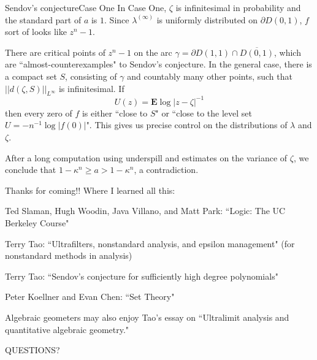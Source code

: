 \documentclass[10pt]{beamer}
\begin{document}
\begin{frame}{Sendov's conjecture}{Case One}
    In Case One, $\zeta$ is infinitesimal in probability and the standard part of $a$ is $1$. \pause
    Since $\lambda^{(\infty)}$ is uniformly distributed on $\partial D(0, 1)$, $f$ sort of looks like $z^n - 1$.

\pause

    There are critical points of $z^n - 1$ on the arc $\gamma = \partial D(1, 1) \cap \overline{D(0, 1)}$, which are ``almost-counterexamples" to Sendov's conjecture. \pause
    In the general case, there is a compact set $S$, consisting of $\gamma$ and countably many other points, such that $||d(\zeta, S)||_{L^\infty}$ is infinitesimal. \pause
    If
    $$U(z) = \mathbf E \log |z - \zeta|^{-1}$$
    then every zero of $f$ is either ``close to $S$" or ``close to the level set $U = -n^{-1}\log |f(0)|$".
    This gives us precise control on the distributions of $\lambda$ and $\zeta$.

\pause

    After a long computation using underspill and estimates on the variance of $\zeta$, we conclude that $1 - \kappa^n \geq a > 1 - \kappa^n$, a contradiction.
\end{frame}

\begin{frame}{Thanks for coming!!}
    Where I learned all this:

    Ted Slaman, Hugh Woodin, Java Villano, and Matt Park: ``Logic: The UC Berkeley Course"

    Terry Tao: ``Ultrafilters, nonstandard analysis, and epsilon management" (for nonstandard methods in analysis)

    Terry Tao: ``Sendov's conjecture for sufficiently high degree polynomials"

    Peter Koellner and Evan Chen: ``Set Theory"

    Algebraic geometers may also enjoy Tao's essay on ``Ultralimit analysis and quantitative algebraic geometry."

    QUESTIONS?
\end{frame}
\end{document}
